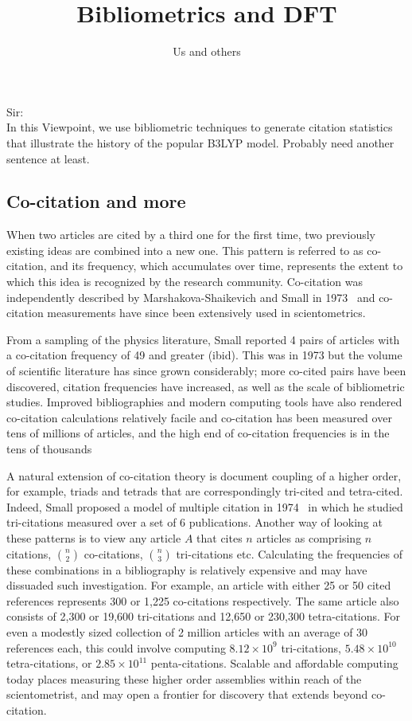 \documentclass[notitlepage]{report}
\title{Bibliometrics and DFT}
\author{Us and others}
\date{}
\begin{document}
\maketitle
\thispagestyle{empty}
Sir:\\

In this Viewpoint, we use bibliometric techniques to generate citation statistics that illustrate the history of the popular B3LYP model. Probably need another sentence at least.

\subsection*{Co-citation and more}When two articles are cited by a third one for the first time, two previously existing ideas are combined into a new one. This pattern is referred to as co-citation, and its frequency, which accumulates over time, represents the extent to which this idea is recognized by the research community. Co-citation was independently described by Marshakova-Shaikevich and Small in 1973~\citep{MarshakovaShaikevich1973,Small1973} and co-citation measurements have since been extensively used in scientometrics. 

From a sampling of the physics literature, Small reported 4 pairs of articles with a co-citation frequency of 49 and greater (ibid). This was in 1973 but the volume of scientific literature has since grown considerably; more co-cited pairs have been discovered, citation frequencies have increased, as well as the scale of bibliometric studies. Improved bibliographies and modern computing tools have also rendered co-citation calculations relatively facile and co-citation has been measured over tens of millions of articles, and the high end of co-citation frequencies is in the tens of thousands~\citep{Stringer2010,Uzzi2013,devarakonda_2020}

A natural extension of co-citation theory is document coupling of a higher order, for example, triads and tetrads that are correspondingly tri-cited and tetra-cited. Indeed, Small proposed a model of multiple citation in 1974~\citep{small1974multiple} in which he studied tri-citations measured over a set of 6 publications. Another way of looking at these patterns is to view any article $A$ that cites $n$ articles as comprising $n$ citations, $n\choose2$ co-citations, $n\choose3$ tri-citations etc. Calculating the frequencies of these combinations in a bibliography is relatively expensive and may have dissuaded such investigation. For example, an article with either 25 or 50 cited references represents 300 or 1,225 co-citations respectively. The same article also consists of  2,300 or 19,600 tri-citations and  12,650 or  230,300 tetra-citations. For even a modestly sized collection of 2 million articles with an average of 30 references each, this could involve computing $8.12\times10^9$ tri-citations, $5.48\times10^{10}$ tetra-citations, or $2.85\times10^{11}$ penta-citations. Scalable and affordable computing today places measuring these higher order assemblies within reach of the scientometrist, and may open a frontier for discovery that extends beyond co-citation.
\end{document}
